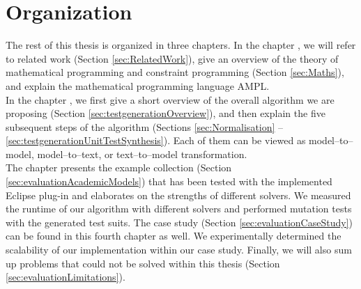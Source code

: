 \section{Organization}
The rest of this thesis is organized in three chapters. In the chapter , we will refer to related work (Section \ref{sec:RelatedWork}), give an overview of the theory of mathematical programming and constraint programming (Section \ref{sec:Maths}), and explain the mathematical programming language AMPL.\\
In the chapter , we first give a short overview of the overall algorithm we are proposing (Section \ref{sec:testgenerationOverview}), and then explain the five subsequent steps of the algorithm (Sections \ref{sec:Normalisation} -- \ref{sec:testgenerationUnitTestSynthesis}). Each of them can be viewed as model--to--model, model--to--text, or text--to--model transformation. 
\\
The chapter  presents the example collection (Section \ref{sec:evaluationAcademicModels}) that has been tested with the implemented Eclipse plug-in and elaborates on the strengths of different solvers. We measured the runtime of our algorithm with different solvers and performed mutation tests with the generated test suits. The case study (Section \ref{sec:evaluationCaseStudy}) can be found in this fourth chapter as well. We experimentally determined the scalability of our implementation within our case study. Finally, we will also sum up problems that could not be solved within this thesis (Section \ref{sec:evaluationLimitations}).
